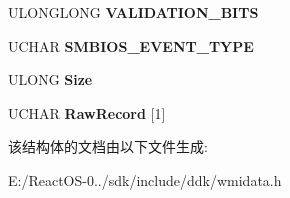 \begin{DoxyCompactItemize}
U\+L\+O\+N\+G\+L\+O\+NG {\bfseries V\+A\+L\+I\+D\+A\+T\+I\+O\+N\+\_\+\+B\+I\+TS}
\item 
\mbox{\label{struct___m_s_m_c_a_event___s_m_b_i_o_s_error_aaba61e69efdfa3af07cb64981b7a4f53}} 
U\+C\+H\+AR {\bfseries S\+M\+B\+I\+O\+S\+\_\+\+E\+V\+E\+N\+T\+\_\+\+T\+Y\+PE}
\item 
\mbox{\label{struct___m_s_m_c_a_event___s_m_b_i_o_s_error_a2dbc39eb733e8d1c56761641f7dba16b}} 
U\+L\+O\+NG {\bfseries Size}
\item 
\mbox{\label{struct___m_s_m_c_a_event___s_m_b_i_o_s_error_a5f0a4dedb20fe6bd3ca389a3eb5ba07d}} 
U\+C\+H\+AR {\bfseries Raw\+Record} \mbox{[}1\mbox{]}
\end{DoxyCompactItemize}


该结构体的文档由以下文件生成\+:\begin{DoxyCompactItemize}
\item 
E\+:/\+React\+O\+S-\/0../sdk/include/ddk/wmidata.\+h\end{DoxyCompactItemize}

